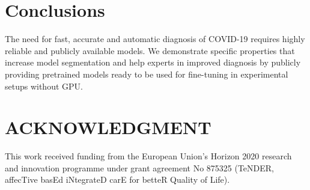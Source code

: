 \documentclass{elsarticle}
\begin{document}
\section{Conclusions}\label{sec:conclusions}
The need for fast, accurate and automatic diagnosis of COVID-19
requires highly reliable and publicly available models.
We demonstrate specific properties that increase model segmentation
and help experts in improved diagnosis by publicly providing
pretrained models ready to be used for fine-tuning in experimental
setups without GPU\@.

\section*{ACKNOWLEDGMENT}
This work received funding from the European Union’s Horizon 2020
research and innovation programme under grant agreement No 875325
(TeNDER, affecTive basEd iNtegrateD carE for betteR Quality of Life).



\end{document}
